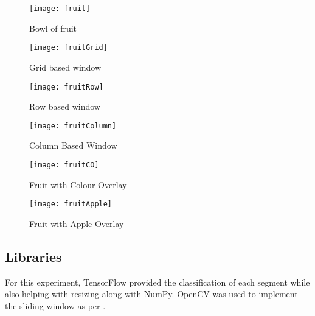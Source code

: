 \begin{figure}[h] 
  \label{fruitBowlManipulations} 
  \begin{minipage}[b]{0.5\linewidth}
    \centering
    \texttt{[image: fruit]}
    \caption{Bowl of fruit \parencite{fruitBowl}}
    \label{fig:fruit}
    \vspace{4ex}
  \end{minipage}%
  \begin{minipage}[b]{0.5\linewidth}
    \centering
    \texttt{[image: fruitGrid]}
	\caption{Grid based window}
    \label{fig:fruitGrid}
    \vspace{4ex}
  \end{minipage} 
  \begin{minipage}[b]{0.5\linewidth}
    \centering
    \texttt{[image: fruitRow]}
    \caption{Row based window}
    \label{fig:fruitRow}
    \vspace{4ex}
  \end{minipage}%
  \begin{minipage}[b]{0.5\linewidth}
    \centering
    \texttt{[image: fruitColumn]}
    \caption{Column Based Window}
    \label{fig:fruitColumn}
    \vspace{4ex}
  \end{minipage}
  \begin{minipage}[b]{0.5\linewidth}
    \centering
    \texttt{[image: fruitCO]}
    \caption{Fruit with Colour Overlay}
    \label{fig:fruitOverlay}
    \vspace{4ex}
  \end{minipage}%
  \begin{minipage}[b]{0.5\linewidth}
    \centering
    \texttt{[image: fruitApple]}
    \caption{Fruit with Apple Overlay}
    \label{fig:fruitApple}
    \vspace{4ex}
  \end{minipage}
\end{figure}
\afterpage{\clearpage}

\tocless\subsection{Libraries}
For this experiment, TensorFlow provided the classification of each segment while
also helping with resizing along with NumPy. OpenCV was used to implement the
sliding window as per \parencite{slidingWindowTut}.

